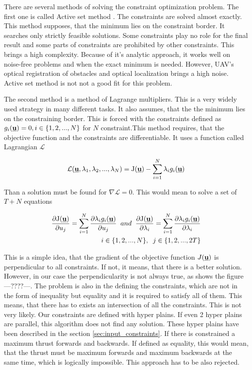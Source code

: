 \documentclass[a4paper,11pt,titlepage]{article}
\newcommand{\Lagr}{\mathcal{L}}
\newcommand{\uvec}{\textbf{\underline{u}}}
\begin{document}
There are several methods of solving the constraint optimization problem.
The first one is called Active set method \cite{schittkowski1983convergence}. The constraints are solved almost exactly. This method supposes, that the minimum lies on the constraint border. It searches only strictly feasible solutions. Some constraints play no role for the final result and some parts of constraints are prohibited by other constraints. This brings a high complexity. Because of it's analytic approach, it works well on noise-free problems and when the exact minimum is needed. However, UAV's optical registration of obstacles and optical localization brings a high noise. Active set method is not not a good fit for this problem.

The second method is a method of Lagrange multipliers. This is a very widely used strategy in many different tasks. It also assumes, that the the minimum lies on the constraining border. This is forced with the constraints defined as $g_i(\uvec) = 0, i \in \{1, 2, ..., N\}$ for $N$ constraint.This method requires, that the objective function and the constraints are differentiable. It uses a function called Lagrangian $\Lagr$

\begin{equation}
\label{Lagrangian}
\Lagr(\uvec, \lambda_1, \lambda_2, ..., \lambda_N) = \mathrm{J}(\uvec) - \sum_{i = 1}^N \lambda_i g_i(\uvec)
\end{equation}

Than a solution must be found for $\nabla \Lagr = 0$. This would mean to solve a set of $T + N$ equations 

\begin{equation}
\label{Lagrangian}
\begin{split}
\frac{\partial \mathrm{J(\uvec)}}{\partial u_j} =  \sum_{i = 1}^N \frac{\partial \lambda_i g_i(\uvec) }{\partial u_j} \;\; and \;\;\frac{\partial \mathrm{J(\uvec)}}{\partial \lambda_i} =  \sum_{i = 1}^N \frac{\partial \lambda_i g_i(\uvec) }{\partial \lambda_i}\\
i \in \{1, 2, ..., N\},\;\;j \in \{1, 2, ..., 2T\}
\end{split}
\end{equation}

This is a simple idea, that the gradient of the objective function $J(\uvec)$ is perpendicular to all constraints. If not, it means, that there is a better solution. However, in our case the perpendicularity is not always true, as shows the figure ---????---. The problem is also in the defining the constraints, which are not in the form of inequality but equality and it is required to satisfy all of them. This means, that there has to exists an intersection of all the constraints. This is not very likely. Our constraints are defined with hyper plains. If even 2 hyper plains are parallel, this algorithm does not find any solution. These hyper plains have been described in the section \ref{sec:input_constraints}. If there is constrained a maximum thrust forwards and backwards. If defined as equality, this would mean, that the thrust must be maximum forwards and maximum backwards at the same time, which is logically impossible. This approach has to be also rejected.
\end{document}
